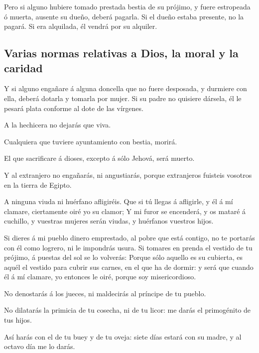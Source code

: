  Pero si alguno hubiere tomado prestada bestia de su
prójimo, y fuere estropeada ó muerta, ausente su dueño, deberá pagarla.
 Si el dueño estaba presente, no la pagará. Si era
alquilada, él vendrá por su alquiler.

\hypertarget{varias-normas-relativas-a-dios-la-moral-y-la-caridad}{%
\subsection{Varias normas relativas a Dios, la moral y la
caridad}\label{varias-normas-relativas-a-dios-la-moral-y-la-caridad}}

 Y si alguno engañare á alguna doncella que no fuere
desposada, y durmiere con ella, deberá dotarla y tomarla por mujer.
 Si su padre no quisiere dársela, él le pesará plata
conforme al dote de las vírgenes.

 A la hechicera no dejarás que viva.

 Cualquiera que tuviere ayuntamiento con bestia, morirá.

 El que sacrificare á dioses, excepto á sólo Jehová, será
muerto.

 Y al extranjero no engañarás, ni angustiarás, porque
extranjeros fuisteis vosotros en la tierra de Egipto.

 A ninguna viuda ni huérfano afligiréis. 
Que si tú llegas á afligirle, y él á mí clamare, ciertamente oiré yo su
clamor;  Y mi furor se encenderá, y os mataré á cuchillo,
y vuestras mujeres serán viudas, y huérfanos vuestros hijos.

 Si dieres á mi pueblo dinero emprestado, al pobre que
está contigo, no te portarás con él como logrero, ni le impondrás usura.
 Si tomares en prenda el vestido de tu prójimo, á puestas
del sol se lo volverás:  Porque sólo aquello es su
cubierta, es aquél el vestido para cubrir sus carnes, en el que ha de
dormir: y será que cuando él á mí clamare, yo entonces le oiré, porque
soy misericordioso.

 No denostarás á los jueces, ni maldecirás al príncipe de
tu pueblo.

 No dilatarás la primicia de tu cosecha, ni de tu licor:
me darás el primogénito de tus hijos.

 Así harás con el de tu buey y de tu oveja: siete días
estará con su madre, y al octavo día me lo darás.

